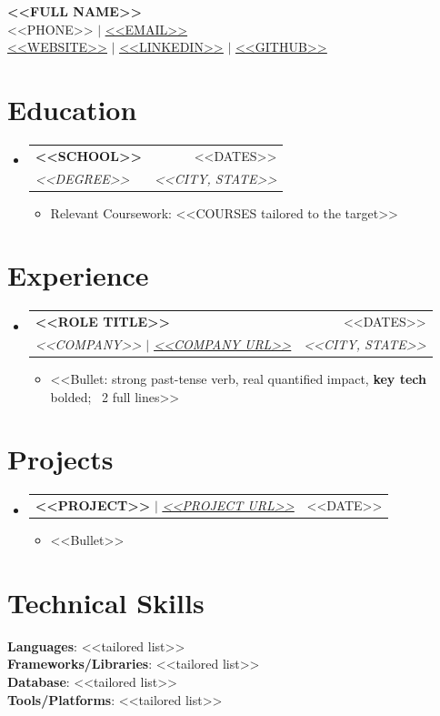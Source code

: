 \documentclass[letterpaper,11pt]{article}
\makeatletter
\newcommand{\resumeItem}[1]{
  \item\footnotesize{#1}
}
\newcommand{\resumeSubheading}[4]{
  \vspace{-2pt}\item
    \begin{tabular*}{0.97\textwidth}[t]{l@{\extracolsep{\fill}}r}
      \textbf{#1} & #2 \\
      \textit{\small#3} & \textit{\small #4} \\
    \end{tabular*}\vspace{-7pt}
}
\newcommand{\resumeProjectHeading}[2]{
    \item
    \begin{tabular*}{0.97\textwidth}{l@{\extracolsep{\fill}}r}
      \small#1 & #2 \\
    \end{tabular*}\vspace{-5pt}
}
\newcommand{\resumeSubHeadingListStart}{\begin{itemize}[leftmargin=0.15in, label={}]}
\newcommand{\resumeSubHeadingListEnd}{\end{itemize}}
\newcommand{\resumeItemListStart}{\begin{itemize}}
\newcommand{\resumeItemListEnd}{\end{itemize}\vspace{-5pt}}
\makeatother
\begin{document}
\begin{center}
    \textbf{\Huge \scshape <<FULL NAME>>} \\ \vspace{2pt}
    \small <<PHONE>> $|$ \href{mailto:<<EMAIL>>}{\underline{<<EMAIL>>}}   \\ \vspace{2pt}
    \href{https://<<WEBSITE>>}{\underline{<<WEBSITE>>}} $|$
    \href{https://<<LINKEDIN URL>>}{\underline{<<LINKEDIN>>}} $|$
    \href{https://<<GITHUB URL>>}{\underline{<<GITHUB>>}}
\end{center}

\section{Education}
  \resumeSubHeadingListStart
    \resumeSubheading
      {<<SCHOOL>>}{<<DATES>>}
      {<<DEGREE>>}{<<CITY, STATE>>}
      \resumeItemListStart
        \resumeItem{Relevant Coursework: <<COURSES tailored to the target>>}
      \resumeItemListEnd
  \resumeSubHeadingListEnd

\section{Experience}
\resumeSubHeadingListStart

\resumeSubheading
  {<<ROLE TITLE>>}{<<DATES>>}
  {<<COMPANY>> $|$ \href{https://<<COMPANY URL>>}{\underline{<<COMPANY URL>>}}}{<<CITY, STATE>>}
  \resumeItemListStart
    \resumeItem{<<Bullet: strong past-tense verb, real quantified impact, \textbf{key tech} bolded; ~2 full lines>>}
  \resumeItemListEnd

\resumeSubHeadingListEnd

\section{Projects}
  \resumeSubHeadingListStart

\resumeProjectHeading
  {\textbf{<<PROJECT>>} $|$ \href{https://<<PROJECT URL>>}{\emph{\underline{<<PROJECT URL>>}}}}{<<DATE>>}
  \resumeItemListStart
    \resumeItem{<<Bullet>>}
  \resumeItemListEnd

  \resumeSubHeadingListEnd

\section{Technical Skills}
 \begin{itemize}[leftmargin=0.15in, label={}]
    \small{\item{
     \textbf{Languages}{: <<tailored list>>} \\
     \textbf{Frameworks/Libraries}{: <<tailored list>>} \\
     \textbf{Database}{: <<tailored list>>} \\
     \textbf{Tools/Platforms}{: <<tailored list>>}
    }}
 \end{itemize}
\end{document}
